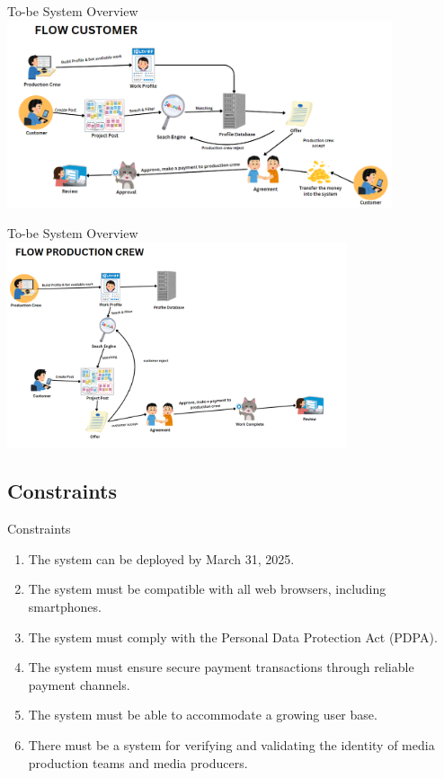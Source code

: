 \documentclass[aspectratio=169]{beamer}
\begin{document}
\begin{frame}{To-be System Overview}
    \centering
    \includegraphics[width=0.85\textwidth]{flowcustomer.png}
\end{frame}
\begin{frame}{To-be System Overview}
    \centering
    \includegraphics[width=0.75\textwidth]{flowerproductioncrew.png}
\end{frame}


\subsection{Constraints}
\begin{frame}{Constraints}
    \begin{enumerate}
        \item The system can be deployed by March 31, 2025.
        \item The system must be compatible with all web browsers, including smartphones.
        \item The system must comply with the Personal Data Protection Act (PDPA).
        \item The system must ensure secure payment transactions through reliable payment channels.
        \item The system must be able to accommodate a growing user base.
        \item There must be a system for verifying and validating the identity of media production teams and media producers.
    \end{enumerate}
\end{frame}
\end{document}
